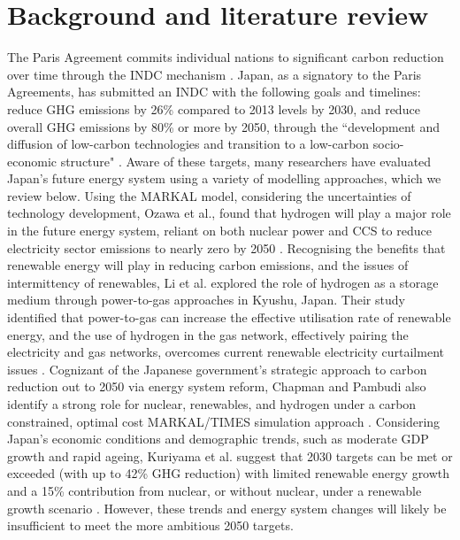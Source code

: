 \section{Background and literature review} \label{litreview}
The Paris Agreement commits individual nations to significant carbon reduction over time through the \gls{INDC} mechanism \cite{united_nations_framework_convention_on_climate_change_unfccc_submission_2015}. Japan, as a signatory to the Paris Agreements, has submitted an INDC with the following goals and timelines: reduce GHG emissions by 26\% compared to 2013 levels by 2030, and reduce overall GHG emissions by 80\% or more by 2050, through the ``development and diffusion of low-carbon technologies and transition to a low-carbon socio-economic structure" \cite{united_nations_framework_convention_on_climate_change_unfccc_submission_2015}. 
Aware of these targets, many researchers have evaluated Japan's future energy system using a variety of modelling approaches, which we review below. Using the \gls{MARKAL} model, considering the uncertainties of technology development, Ozawa et al., found that hydrogen will play a major role in the future energy system, reliant on both nuclear power and \gls{CCS} to reduce electricity sector emissions to nearly zero by 2050 \cite{ozawa_hydrogen_2018}. Recognising the benefits that renewable energy will play in reducing carbon emissions, and the issues of intermittency of renewables, Li et al. explored the role of hydrogen as a storage medium through power-to-gas approaches in Kyushu, Japan. Their study identified that power-to-gas can increase the effective utilisation rate of renewable energy, and the use of hydrogen in the gas network, effectively pairing the electricity and gas networks, overcomes current renewable electricity curtailment issues \cite{li_potential_2019}. Cognizant of the Japanese government's strategic approach to carbon reduction out to 2050 via energy system reform, Chapman and Pambudi also identify a strong role for nuclear, renewables, and hydrogen under a carbon constrained, optimal cost MARKAL/TIMES simulation approach \cite{chapman_strategic_2018}. Considering Japan's economic conditions and demographic trends, such as moderate GDP growth and rapid ageing, Kuriyama et al. suggest that 2030 targets can be met or exceeded (with up to 42\% GHG reduction) with limited renewable energy growth and a 15\% contribution from nuclear, or without nuclear, under a renewable growth scenario \cite{kuriyama_can_2019}. However, these trends and energy system changes will likely be insufficient to meet the more ambitious 2050 targets. 

